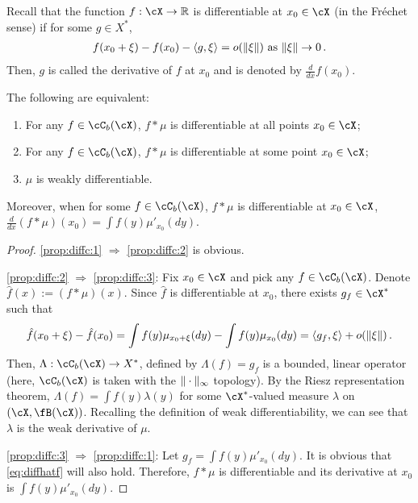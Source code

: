 \documentclass[11pt,letterpaper,english]{article}
\newcommand{\Borel}{\fB}
\newcommand{\Cb}{\cC_b}
\begin{document}
Recall that the function $f: \cX \to \R$ is differentiable at $x_0\in \cX$ (in the Fr\'echet sense) if 
for some $g\in X^*$,
\begin{align*}
f(x_0+\xi) - f(x_0) - \langle g,\xi \rangle = o(\|\xi\|) \text{ as } \|\xi\| \to 0\,.
\end{align*}
Then, $g$ is called the derivative of $f$ at $x_0$ and is denoted by $\frac{d}{dx}f(x_0)$.
\begin{proposition}
\label{prop:diffconvolution}
The following are equivalent:
\begin{enumerate}
\item \label{prop:diffc:1}
	 For any $f \in \Cb(\cX)$, $f*\mu$ is differentiable at all points $x_0\in \cX$; 
\item \label{prop:diffc:2}
	 For any $f \in \Cb(\cX)$, $f*\mu$ is differentiable at some point $x_0\in \cX$; 
\item \label{prop:diffc:3}
	 $\mu$ is weakly differentiable. 
\end{enumerate}
Moreover, when  for some $f\in \Cb(\cX)$, $f*\mu$ is differentiable at $x_0\in \cX$,
$\frac{d}{dx} (f*\mu) (x_0) = \int f(y)\mu'_{x_0}(dy)$.
\end{proposition}
\begin{proof}
 \eqref{prop:diffc:1} $\Rightarrow$ \eqref{prop:diffc:2} is obvious.
 
 \eqref{prop:diffc:2} $\Rightarrow$ \eqref{prop:diffc:3}:
 Fix $x_0\in \cX$ and pick any $f\in\Cb(\cX)$.
Denote $\hat{f}(x) := (f*\mu)(x)$. 
Since $\hat{f}$ is differentiable at $x_0$, there exists $g_f \in \cX^*$ such that
\begin{align}
\label{eq:diffhatf}
\hat{f}(x_0+\xi) - \hat{f}(x_0) 
= \int f(y)\mu_{x_0+\xi}(dy) - \int f(y)\mu_{x_0}(dy)
= \langle g_f, \xi \rangle+o(\|\xi\|) \,.
\end{align}
Then, $\Lambda:\Cb(\cX) \to X^*$, defined by $\Lambda(f)= g_f$ is a bounded, linear operator (here, $\Cb(\cX)$ is taken with the $\|\cdot\|_\infty$ topology). By the Riesz representation theorem,   
$\Lambda(f) = \int f(y) \lambda(y)$ for some $\cX^*$-valued measure $\lambda$ on $(\cX,\Borel(\cX))$.
Recalling the definition of weak differentiability, we can see that $\lambda$ is the weak derivative of $\mu$. 

 \eqref{prop:diffc:3} $\Rightarrow$ \eqref{prop:diffc:1}:
Let $g_f=\int f(y)\mu'_{x_0}(dy)$. It is obvious that \eqref{eq:diffhatf} will also hold. 
Therefore, $f*\mu$ is differentiable and its derivative  at $x_0$ is $\int f(y)\mu'_{x_0}(dy)$.
\end{proof}
\end{document}
